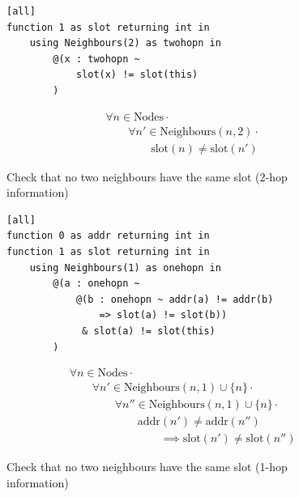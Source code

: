 \begin{figure}[H]
\begin{minipage}{.5\linewidth}
\begin{lstlisting}[language=Hoppy]
[all]
function 1 as slot returning int in
    using Neighbours(2) as twohopn in
        @(x : twohopn ~
            slot(x) != slot(this)
        )
\end{lstlisting}
\end{minipage}%
\begin{minipage}{.5\linewidth}
\begin{align*}
&				\forall n \in \text{Nodes} \cdot \\
& \hspace{2em}		\forall n' \in \text{Neighbours}(n, 2) \cdot \\
& \hspace{4em}				\text{slot}(n) \neq \text{slot}(n')
\end{align*}
\end{minipage}

\caption{Check that no two neighbours have the same slot (2-hop information)}
\label{fig:two-hop-slot-pred-lang}
\end{figure}

\begin{figure}[H]
\begin{minipage}{.5\linewidth}
\begin{lstlisting}[language=Hoppy]
[all]
function 0 as addr returning int in
function 1 as slot returning int in
    using Neighbours(1) as onehopn in
        @(a : onehopn ~
            @(b : onehopn ~ addr(a) != addr(b)
                => slot(a) != slot(b))
             & slot(a) != slot(this)
        )
\end{lstlisting}
\end{minipage}%
\begin{minipage}{.5\linewidth}
\begin{align*}
&				\forall n \in \text{Nodes} \cdot \\
& \hspace{2em}		\forall n' \in \text{Neighbours}(n, 1) \cup \{n\} \cdot \\
& \hspace{4em}			\forall n'' \in \text{Neighbours}(n, 1) \cup \{n\} \cdot \\
& \hspace{6em}				\text{addr}(n') \not= \text{addr}(n'') \\
& \hspace{8em}					\implies \text{slot}(n') \neq \text{slot}(n'')
\end{align*}
\end{minipage}
\caption{Check that no two neighbours have the same slot (1-hop information)}
\label{fig:one-hop-slot-pred-lang}
\end{figure}


